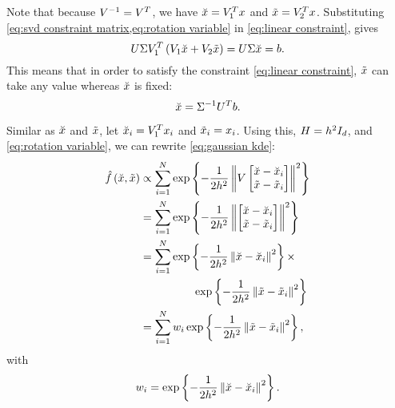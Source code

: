 Note that because $V^{-1} = V^T$, we have $\breve{x} = V_1^T x$ and $\tilde{x} = V_2^T x$.
Substituting \cref{eq:svd constraint matrix,eq:rotation variable} in \cref{eq:linear constraint}, gives
\begin{equation}
	\label{eq:linear constraint after rotation}
	U \Sigma V_1^T \left( V_1 \breve{x} + V_2 \tilde{x} \right)
	= U \Sigma \breve{x} = b.
\end{equation}
This means that in order to satisfy the constraint \cref{eq:linear constraint}, $\tilde{x}$ can take any value whereas $\breve{x}$ is fixed:
\begin{equation}
	\label{eq:fixed part}
	\breve{x} = \Sigma^{-1} U^T b.
\end{equation}

Similar as $\breve{x}$ and $\tilde{x}$, let $\breve{x}_{i}=V_1^T x_{i}$ and $\tilde{x}_{i}=x_{i}$. Using this, $H=h^2 I_{d}$, and \cref{eq:rotation variable}, we can rewrite \cref{eq:gaussian kde}:
\begin{align*}
	\densityest{\variableconstrained, \variableunconstrained} 
	&\propto \sum_{\indexdata=1}^{\numberofsamples}
	\e{ -\frac{1}{2\bandwidth^2}
		\normtwo{ V \begin{bmatrix} 
			\variableconstrained - \datapointconstrained{\indexdata} \\ 
			\variableunconstrained - \datapointunconstrained{\indexdata}
		\end{bmatrix}}^2
	} \\
	&= \sum_{\indexdata=1}^{\numberofsamples}
	\e{ -\frac{1}{2\bandwidth^2}
		\normtwo{ \begin{bmatrix} 
			\variableconstrained - \datapointconstrained{\indexdata} \\ 
			\variableunconstrained - \datapointunconstrained{\indexdata}
		\end{bmatrix}}^2
	} \\
	&=\sum_{\indexdata=1}^{\numberofsamples}
	\e{ -\frac{1}{2\bandwidth^2} \normtwo{ \variableconstrained - \datapointconstrained{\indexdata} }^2} \times \\
	&\superquad \e{ -\frac{1}{2\bandwidth^2} \normtwo{ \variableunconstrained - \datapointunconstrained{\indexdata} }^2} \\
	&=\sum_{\indexdata=1}^{\numberofsamples}
	\weight{\indexdata} \e{ -\frac{1}{2\bandwidth^2} \normtwo{ \variableunconstrained - \datapointunconstrained{\indexdata} }^2},
\end{align*}
with
\begin{equation}
	\label{eq:weights constrained simple}
	w_{i} = \exp\left\{  -\frac{1}{2h^2} \left\Vert  \breve{x} - \breve{x}_{i}  \right\Vert^2 \right\}.
\end{equation}

